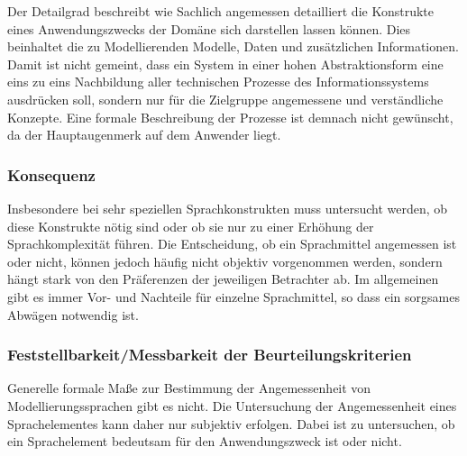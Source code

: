 Der Detailgrad beschreibt wie Sachlich angemessen detailliert die Konstrukte eines Anwendungszwecks der Domäne sich darstellen lassen können. Dies beinhaltet die zu Modellierenden Modelle, Daten und zusätzlichen Informationen. Damit ist nicht gemeint, dass ein System in einer hohen Abstraktionsform eine eins zu eins Nachbildung aller technischen Prozesse des Informationssystems ausdrücken soll,
sondern nur für die Zielgruppe angemessene und verständliche Konzepte. Eine formale Beschreibung der Prozesse ist demnach nicht gewünscht, da der Hauptaugenmerk auf dem Anwender liegt.

\subsubsection{Konsequenz}
Insbesondere bei sehr speziellen Sprachkonstrukten muss untersucht werden,
ob diese Konstrukte nötig sind oder ob sie nur zu einer Erhöhung der Sprachkomplexität führen.
Die Entscheidung, ob ein Sprachmittel angemessen ist oder nicht, können jedoch häufig nicht objektiv vorgenommen werden,
sondern hängt stark von den Präferenzen der jeweiligen Betrachter ab. Im allgemeinen gibt es immer Vor- und Nachteile
für einzelne Sprachmittel, so dass ein sorgsames Abwägen notwendig ist.

\subsubsection{Feststellbarkeit/Messbarkeit der Beurteilungskriterien} 
Generelle formale Maße zur Bestimmung der Angemessenheit von Modellierungssprachen gibt es
nicht. Die Untersuchung der Angemessenheit eines Sprachelementes kann daher nur subjektiv erfolgen.
Dabei ist zu untersuchen, ob ein Sprachelement bedeutsam für den Anwendungszweck ist oder
nicht.

